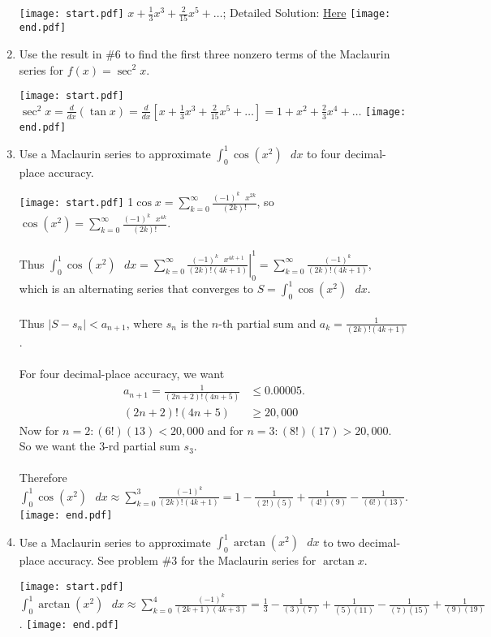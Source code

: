 \documentclass[12pt]{article}
\begin{document}
\begin{enumerate}
\texttt{[image: start.pdf]}
{{$x+\frac{1}{3}x^3+\frac{2}{15}x^5+\ldots$; Detailed Solution: \textcolor{blue}{\href{http://www.math.drexel.edu/classes/Calculus/resources/Math123HW/Solutions/123_14_Diff_Int_Series_06.pdf}{Here}}}}
\texttt{[image: end.pdf]}


\item Use the result in $\#6$ to find the first three nonzero terms of the Maclaurin series for $f(x)=\sec^2{x}$.

\texttt{[image: start.pdf]}
{{$\sec^2{x}=\frac{d}{dx}(\tan{x})=\frac{d}{dx}{\left[x+\frac{1}{3}x^3+\frac{2}{15}x^5+\ldots \right]}=1+x^2+\frac{2}{3}x^4+\ldots$ }}
\texttt{[image: end.pdf]}


\item Use a Maclaurin series to approximate $\int_0^1{\cos(x^2)} \text{ } dx $ to four decimal-place accuracy.

\texttt{[image: start.pdf]}
{{{1\linewidth}{$\cos{x}=\sum_{k=0}^{\infty}{\frac{(-1)^k \text{ } x^{2k}}{(2k)!}}$, so $\cos{(x^2)}=\sum_{k=0}^{\infty}{\frac{(-1)^k \text{ } x^{4k}}{(2k)!}}$.
\\ \\  Thus  $\int_0^1{\cos(x^2)} \text{ } dx = \left.\sum_{k=0}^{\infty}{\frac{(-1)^k \text{ } x^{4k+1}}{(2k)!(4k+1)}}\right|_0^1=\sum_{k=0}^{\infty}{\frac{(-1)^k}{(2k)!(4k+1)}}$, 
\\ which is an alternating series that converges to $S=\int_0^1{\cos(x^2)} \text{ } dx$.
\\ \\ Thus $|S-s_n|<a_{n+1}$, where $s_n$ is the $n$-th partial sum and $\textstyle a_k=\frac{1}{(2k)!(4k+1)}$.
\\ \\ For four decimal-place accuracy, we want 
\begin{align*} a_{n+1} = \frac{1}{(2n+2)!(4n+5)} &\leq 0.00005.
\\ (2n+2)!(4n+5) &\geq 20,000 \end{align*} 
Now for $n=2: (6!)(13) < 20,000$ and for $n=3: (8!)(17) > 20,000$.  
\\ So we want the $3$-rd partial sum $s_3$. 
\\ \\ Therefore  $\int_0^1{\cos(x^2)} \text{ } dx \approx \sum_{k=0}^{3}{\frac{(-1)^k}{(2k)!(4k+1)}} = 1 - \frac{1}{(2!)(5)}+\frac{1}{(4!)(9)}-\frac{1}{(6!)(13)}$.  }}}
\texttt{[image: end.pdf]}


\item Use a Maclaurin series to approximate $\int_0^1{\arctan(x^2)} \text{ } dx $ to two decimal-place accuracy.  See problem $\#3$ for the Maclaurin series for $\arctan{x}.$  

\texttt{[image: start.pdf]}
{{ $\int_0^1{\arctan(x^2)} \text{ } dx \approx \sum_{k=0}^{4}{\frac{(-1)^k}{(2k+1)(4k+3)}} = \frac{1}{3} - \frac{1}{(3)(7)}+\frac{1}{(5)(11)}-\frac{1}{(7)(15)}+\frac{1}{(9)(19)}$. }}
\texttt{[image: end.pdf]}


\end{enumerate}
\end{document}
